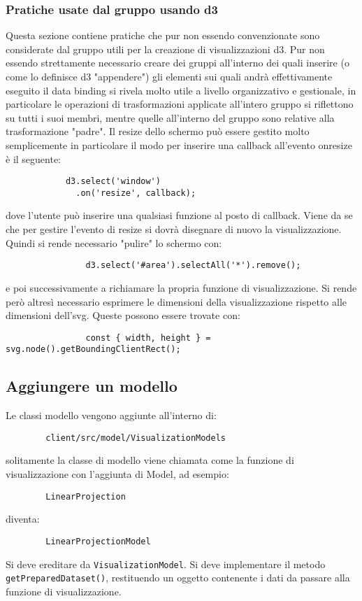         \subsubsection{Pratiche usate dal gruppo usando d3}
            Questa sezione contiene pratiche che pur non essendo convenzionate sono considerate dal gruppo utili per la creazione di visualizzazioni d3.
            Pur non essendo strettamente necessario creare dei gruppi all'interno dei quali inserire (o come lo definisce d3 "appendere") gli elementi sui quali andrà effettivamente eseguito il data binding si rivela molto utile a livello organizzativo e gestionale, in particolare le operazioni di trasformazioni applicate all'intero gruppo si riflettono su tutti i suoi membri, mentre quelle all'interno del gruppo sono relative alla trasformazione "padre".
            Il resize dello schermo può essere gestito molto semplicemente in particolare il modo per inserire una callback all'evento onresize è il seguente:
            \begin{verbatim}
            d3.select('window')
              .on('resize', callback);
            \end{verbatim}
            dove l'utente può inserire una qualsiasi funzione al posto di callback. Viene da se che per gestire l'evento di resize si dovrà disegnare di nuovo la visualizzazione. Quindi si rende necessario "pulire" lo schermo con:
            \begin{verbatim}
                d3.select('#area').selectAll('*').remove();
            \end{verbatim}
            e poi successivamente a richiamare la propria funzione di visualizzazione.
            Si rende però altresì necessario esprimere le dimensioni della visualizzazione rispetto alle dimensioni dell'svg. Queste possono essere trovate con:
            \begin{verbatim}
                const { width, height } = svg.node().getBoundingClientRect();
            \end{verbatim}
    \subsection{Aggiungere un modello}
    Le classi modello vengono aggiunte all'interno di:
    \begin{verbatim}
        client/src/model/VisualizationModels
    \end{verbatim}
    solitamente la classe di modello viene chiamata come la funzione di visualizzazione con l'aggiunta di Model, ad esempio:
    \begin{verbatim}
        LinearProjection
    \end{verbatim}
    diventa:
    \begin{verbatim}
        LinearProjectionModel
    \end{verbatim}
    Si deve ereditare da \texttt{VisualizationModel}. Si deve implementare il metodo \texttt{getPreparedDataset()}, restituendo un oggetto contenente i dati da passare alla funzione di visualizzazione.
    
